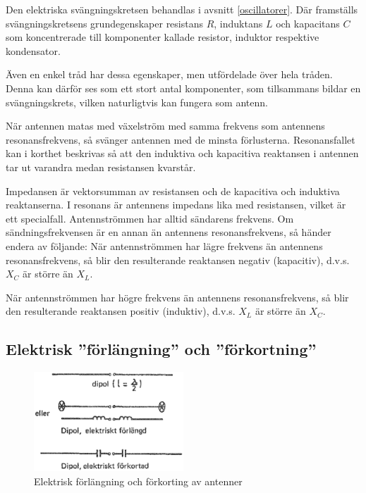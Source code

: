 Den elektriska svängningskretsen behandlas i avsnitt \ref{oscillatorer}. Där framställs
svängningskretsens grundegenskaper resistans \(R\), induktans \(L\)
och kapacitans \(C\) som koncentrerade till komponenter kallade
resistor, induktor respektive kondensator.

Även en enkel tråd har dessa egenskaper, men utfördelade över hela
tråden. Denna kan därför ses som ett stort antal komponenter, som
tillsammans bildar en svängningskrets, vilken naturligtvis kan fungera
som antenn.

När antennen matas med växelström med samma frekvens som antennens
resonansfrekvens, så svänger antennen med de minsta
förlusterna. Resonansfallet kan i korthet beskrivas så att den
induktiva och kapacitiva reaktansen i antennen tar ut varandra medan
resistansen kvarstår.

Impedansen är vektorsumman av resistansen och de kapacitiva och
induktiva reaktanserna. I resonans är antennens impedans lika med
resistansen, vilket är ett specialfall. Antennströmmen har alltid
sändarens frekvens. Om sändningsfrekvensen är en annan än antennens
resonansfrekvens, så händer endera av följande: När antennströmmen har
lägre frekvens än antennens resonansfrekvens, så blir den resulterande
reaktansen negativ (kapacitiv), d.v.s. \(X_C\) är större än \(X_L\).

När antennströmmen har högre frekvens än antennens resonansfrekvens,
så blir den resulterande reaktansen positiv (induktiv), d.v.s. \(X_L\)
är större än \(X_C\).

\subsection{Elektrisk ''förlängning'' och ''förkortning''}

\begin{figure}
  \includegraphics[width=0.5\textwidth]{images/cropped_pdfs/bild_2_6-04.pdf}
  \caption{Elektrisk förlängning och förkorting av antenner}
  \label{fig:bildII6-4}
\end{figure}

